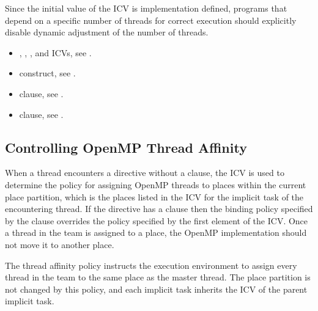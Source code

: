 \begin{note}
Since the initial value of the  ICV is implementation defined, programs
that depend on a specific number of threads for correct execution should explicitly
disable dynamic adjustment of the number of threads.
\end{note}

\crossreferences
\begin{itemize}

\item {}, , , and 
 ICVs, see .

\item {} construct, see .

\item {} clause, see .

\item {} clause, see .
\end{itemize}



\subsection{Controlling OpenMP Thread Affinity}
\label{subsec:Controlling OpenMP Thread Affinity}

When a thread encounters a  directive without a  
clause, the  ICV is used to determine the policy for assigning 
OpenMP threads to places within the current place partition, which is the places 
listed in the  ICV for the implicit task of the encountering 
thread. If the  directive has a  clause then the 
binding policy specified by the  clause overrides the policy 
specified by the first element of the  ICV. Once a thread in the 
team is assigned to a place, the OpenMP implementation should not move it to 
another place.

The  thread affinity policy instructs the execution environment to 
assign every thread in the team to the same place as the master thread. The place 
partition is not changed by this policy, and each implicit task inherits the 
 ICV of the parent implicit task.


